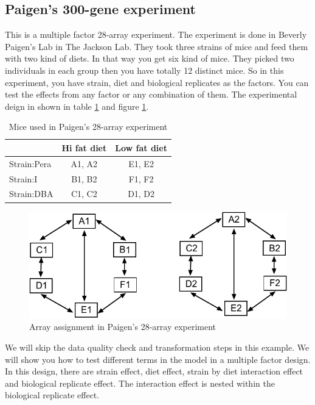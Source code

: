 \newpage
\subsection{Paigen's 300-gene experiment}
This is a multiple factor 28-array experiment. 
The experiment is done in Beverly Paigen's Lab in The Jackson Lab. 
They took three strains of mice and feed them with two kind of 
diets. In that way you get six kind of mice. They picked two
individuals in each group then you have totally 12 distinct mice.
So in this experiment, you have strain, diet and biological replicates
as the factors. You can test the effects from any factor or
any combination of them. 
The experimental deign in shown in table \ref{tbl:paigen} 
and figure \ref{fig:paigen}. 

\begin{table}[htb]
\centering
\begin{tabular}{|l|c|c|} \hline
& Hi fat diet & Low fat diet\\
 \hline
Strain:Pera & A1, A2 & E1, E2\\ \hline
Strain:I & B1, B2 & F1, F2\\ \hline
Strain:DBA & C1, C2 & D1, D2\\ \hline
\end{tabular}
\caption{Mice used in Paigen's 28-array experiment}
\label{tbl:paigen}
\end{table}

\begin{figure}[htbp]
\centering
\includegraphics{paigen}
\caption{Array assignment in Paigen's 28-array experiment}
\label{fig:paigen}
\end{figure}

We will skip the data quality check
and transformation steps in this example.
We will show you how to test different terms in the model
in a multiple factor design. In this design, there are strain
effect, diet effect, strain by diet interaction effect and
biological replicate effect. The interaction effect is nested
within the biological replicate effect.

